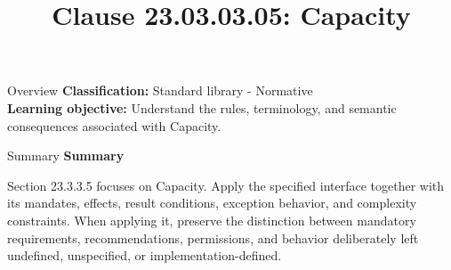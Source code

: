 \documentclass[10pt,letterpaper]{article}
\title{Clause 23.03.03.05: Capacity}
\author{}
\date{}
\begin{document}
\maketitle
\begin{CornellOverviewBox}{Overview}
\textbf{Classification:} Standard library - Normative\\[2pt]
\textbf{Learning objective:} Understand the rules, terminology, and semantic consequences associated with Capacity.
\end{CornellOverviewBox}\begin{CornellSummaryBox}{Summary}
{\sffamily\bfseries\color{Accent} Summary}\par\vspace{3pt}Section 23.3.3.5 focuses on Capacity. Apply the specified interface together with its mandates, effects, result conditions, exception behavior, and complexity constraints. When applying it, preserve the distinction between mandatory requirements, recommendations, permissions, and behavior deliberately left undefined, unspecified, or implementation-defined.
\end{CornellSummaryBox}
\end{document}
